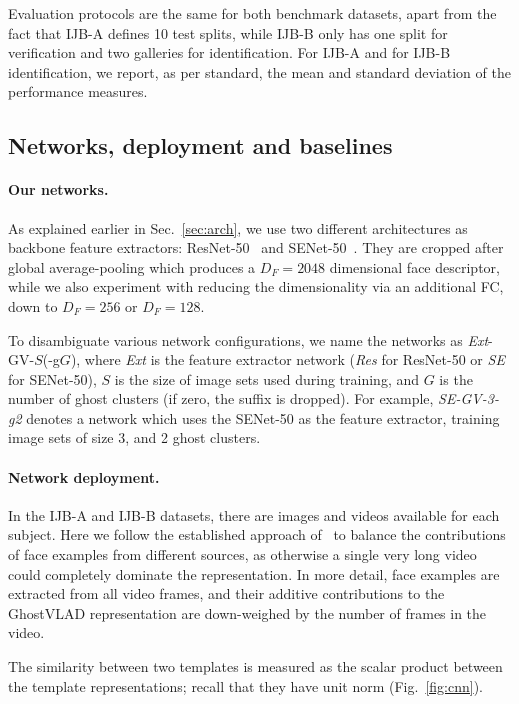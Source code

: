 \documentclass[runningheads]{llncs}
\begin{document}
Evaluation protocols are the same for both 
benchmark datasets, apart from the fact that
IJB-A defines 10 test splits,
while IJB-B only has one split for verification
and two galleries for identification.
For IJB-A and for IJB-B identification, we report,
as per standard, the mean and standard deviation of
the performance measures.




\subsection{Networks, deployment and baselines}

\paragraph{Our networks.}
As explained earlier in Sec.~\ref{sec:arch},
we use two different
architectures as backbone feature extractors:
ResNet-50~\cite{He16} 
and SENet-50~\cite{Hu18}.
%
%
%
%
%
They are cropped after global average-pooling
which produces a $D_F=2048$ dimensional face descriptor,
while we also experiment with reducing the dimensionality
via an additional FC, down to $D_F=256$ or $D_F=128$.

To disambiguate various network configurations,
we name the networks as \emph{Ext}-GV-$S$(-g$G$),
where \emph{Ext} is the feature extractor network
(\emph{Res} for ResNet-50 or \emph{SE} for SENet-50),
$S$ is the size of image sets used during training,
and $G$ is the number of ghost clusters (if zero,
the suffix is dropped).
For example, \emph{SE-GV-3-g2} denotes a network which uses
the SENet-50 as the feature extractor,
training image sets of size 3, and
2 ghost clusters.


\paragraph{Network deployment.}
In the IJB-A and IJB-B datasets, there are images and
videos available for each subject.
Here we follow the established approach of~\cite{Cao18,Crosswhite17}
to balance the contributions of face examples from
different sources, as otherwise a single very long video could
completely dominate the representation.
In more detail, face examples are extracted from
all video frames, and their additive contributions
to the GhostVLAD representation are down-weighed by
the number of frames in the video.
%
%
%
%
%
%
%
%
%
%
%
%
%

The similarity between two templates is measured as the
scalar product between the template representations;
recall that they have unit norm (Fig.~\ref{fig:cnn}).
\end{document}
